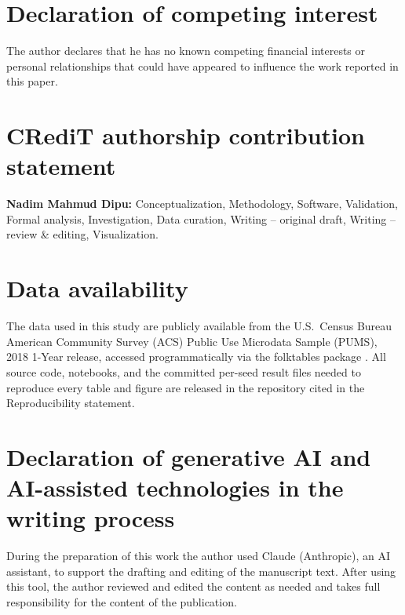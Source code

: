 \documentclass[review,12pt]{elsarticle}
\begin{document}
\section*{Declaration of competing interest}
The author declares that he has no known competing financial interests or personal relationships that could have appeared to influence the work reported in this paper.

\section*{CRediT authorship contribution statement}
\textbf{Nadim Mahmud Dipu:} Conceptualization, Methodology, Software, Validation, Formal analysis, Investigation, Data curation, Writing -- original draft, Writing -- review \& editing, Visualization.

\section*{Data availability}
The data used in this study are publicly available from the U.S.\ Census Bureau American Community Survey (ACS) Public Use Microdata Sample (PUMS), 2018 1-Year release, accessed programmatically via the folktables package \cite{ding2021}. All source code, notebooks, and the committed per-seed result files needed to reproduce every table and figure are released in the repository cited in the Reproducibility statement.

\section*{Declaration of generative AI and AI-assisted technologies in the writing process}
During the preparation of this work the author used Claude (Anthropic), an AI assistant, to support the drafting and editing of the manuscript text. After using this tool, the author reviewed and edited the content as needed and takes full responsibility for the content of the publication.



\end{document}
